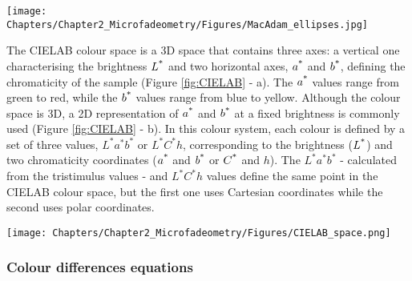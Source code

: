 \begin{figure*}[!h]
\centering
\texttt{[image: Chapters/Chapter2\_Microfadeometry/Figures/MacAdam\_ellipses.jpg]}
\caption[\hspace{0.3cm}MacAdam ellipses]{MacAdam ellipses plotted in the CIE 1931 chromaticity diagram (after \cite[Fig. 24.7]{schubert_light-emitting_2018}}
\label{fig:MacAdam_ellipses}
\end{figure*}


The CIELAB colour space is a 3D space that contains three axes: a vertical one characterising the brightness $L\textsuperscript{*}$ and two horizontal axes, $a\textsuperscript{*}$ and $b\textsuperscript{*}$, defining the chromaticity of the sample (Figure \ref{fig:CIELAB} - a). The $a\textsuperscript{*}$ values range from green to red, while the $b\textsuperscript{*}$ values range from blue to yellow. Although the colour space is 3D, a 2D representation of $a\textsuperscript{*}$ and $b\textsuperscript{*}$ at a fixed brightness is commonly used (Figure \ref{fig:CIELAB} - b). In this colour system, each colour is defined by a set of three values, $L^*a^*b^*$ or $L^*C^*h$, corresponding to the brightness ($L\textsuperscript{*}$) and two chromaticity coordinates ($a\textsuperscript{*}$ and $b\textsuperscript{*}$ or $C\textsuperscript{*}$ and $h$). The $L^*a^*b^*$ - calculated from the tristimulus values - and $L^*C^*h$ values define the same point in the CIELAB colour space, but the first one uses Cartesian coordinates while the second uses polar coordinates.


\begin{figure*}
\centering
\texttt{[image: Chapters/Chapter2\_Microfadeometry/Figures/CIELAB\_space.png]}
\caption[\hspace{0.3cm}CIELAB colour space]{CIELAB colour space: (a) 3D representation (image taken from \url{https://sensing.konicaminolta.asia/what-is-cie-1976-lab-color-space/}, accessed on 28/06/2023) ; (b) 2D representation (image taken from \url{http://meterglobal.com/info-1.html}, accessed on 28/06/2023).}
\label{fig:CIELAB}
\end{figure*}


\subsubsection{Colour differences equations}
\label{sec:colour_diff_eq}

